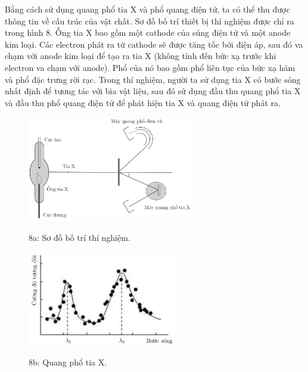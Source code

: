 \noindent Bằng cách sử dụng quang phổ tia X và phổ quang điện tử, ta có thể thu được thông tin về cấu trúc của vật chất. Sơ đồ bố trí thiết bị thí nghiệm được chỉ ra trong hình 8. Ống tia X bao gồm một cathode của súng điện tử và một anode kim loại. Các electron phát ra từ cathode sẽ được tăng tốc bởi điện áp, sau đó va chạm với anode kim loại để tạo ra tia X (không tính đến bức xạ trước khi electron va chạm với anode). Phổ của nó bao gồm phổ liên tục của bức xạ hãm và phổ đặc trưng rời rạc. Trong thí nghiệm, người ta sử dụng tia X có bước sóng nhất định để tương tác với bia vật liệu, sau đó sử dụng đầu thu quang phổ tia X và đầu thu phổ quang điện tử để phát hiện tia X và quang điện tử phát ra.
\newpage

\begin{figure}[h]
  \centering
  \includegraphics[width=0.65\textwidth]{images/Hinh 8a.png}
  \begin{center}
    \figurename{ 8a: Sơ đồ bố trí thí nghiệm.}
  \end{center}
\end{figure}

\begin{figure}[h]
  \centering
  \includegraphics[width=0.58\textwidth]{images/Hinh 8b.png}
  \begin{center}
    \figurename{ 8b: Quang phổ tia X.}
  \end{center}
\end{figure}

